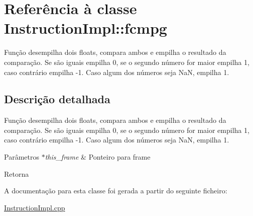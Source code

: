 \hypertarget{class_instruction_impl_1_1fcmpg}{}\section{Referência à classe Instruction\+Impl\+:\+:fcmpg}
\label{class_instruction_impl_1_1fcmpg}


Função desempilha dois floats, compara ambos e empilha o resultado da comparação. Se são iguais empilha 0, se o segundo número for maior empilha 1, caso contrário empilha -\/1. Caso algum dos números seja NaN, empilha 1.  




\subsection{Descrição detalhada}
Função desempilha dois floats, compara ambos e empilha o resultado da comparação. Se são iguais empilha 0, se o segundo número for maior empilha 1, caso contrário empilha -\/1. Caso algum dos números seja NaN, empilha 1. 


\begin{DoxyParams}{Parâmetros}
{\em $\ast$this\+\_\+frame} & Ponteiro para frame \\
\hline
\end{DoxyParams}
\begin{DoxyReturn}{Retorna}

\end{DoxyReturn}


A documentação para esta classe foi gerada a partir do seguinte ficheiro\+:\begin{DoxyCompactItemize}
\item 
\hyperlink{_instruction_impl_8cpp}{Instruction\+Impl.\+cpp}\end{DoxyCompactItemize}
